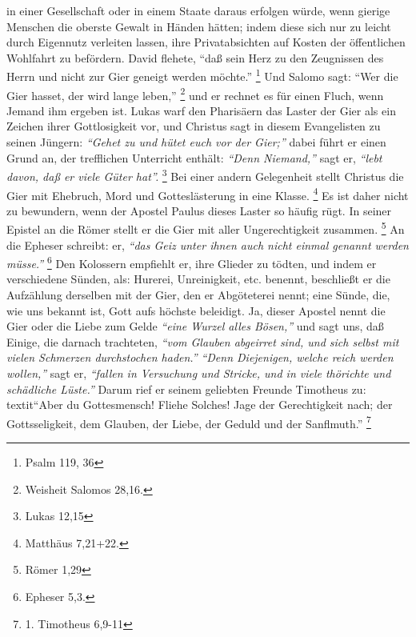 in einer
Gesellschaft oder in einem Staate daraus erfolgen würde, wenn
gierige Menschen
die oberste Gewalt in Händen hätten; indem diese sich nur zu leicht durch
Eigennutz verleiten lassen, ihre Privatabsichten auf Kosten der öffentlichen
Wohlfahrt zu befördern. David flehete,
"`daß sein Herz zu den Zeugnissen des
Herrn und nicht zur Gier geneigt werden möchte."'
\footnote{Psalm 119, 36}
Und
Salomo sagt:
"`Wer die Gier hasset, der wird lange leben,"'
\footnote{Weisheit Salomos 28,16.}
und er rechnet es für einen Fluch, wenn Jemand ihm ergeben ist. Lukas
warf den Pharisäern das Laster der Gier als ein
Zeichen ihrer Gottlosigkeit
vor, und Christus sagt in diesem Evangelisten zu seinen Jüngern:
\textit{"`Gehet zu und
hütet euch vor der Gier;"'} dabei führt er einen Grund an, der trefflichen
Unterricht enthält: \textit{"`Denn Niemand,"'} sagt er,
\textit{"`lebt davon, daß er viele Güter hat"'.}
\footnote{Lukas 12,15}
Bei einer andern Gelegenheit stellt Christus die Gier mit Ehebruch, Mord und
Gotteslästerung in eine Klasse.
\footnote{Matthäus 7,21+22.}
Es ist daher nicht zu bewundern, wenn der Apostel Paulus dieses
Laster so häufig rügt. In seiner Epistel an die Römer stellt er die Gier mit
aller Ungerechtigkeit zusammen.
\footnote{Römer 1,29}
An die Epheser schreibt: er,
\textit{"`das Geiz unter ihnen auch nicht einmal genannt werden müsse."'}
\footnote{Epheser 5,3.}
Den Kolossern empfiehlt er, ihre Glieder zu tödten, und indem er
verschiedene Sünden, als: Hurerei, Unreinigkeit, etc. benennt, beschließt er
die Aufzählung derselben mit der Gier, den er Abgöteterei
nennt; eine Sünde,
die, wie uns bekannt ist, Gott aufs höchste beleidigt. Ja, dieser Apostel nennt
die Gier oder die Liebe zum Gelde \textit{"`eine Wurzel alles Bösen,"'}
 und sagt uns, daß
Einige, die darnach trachteten, \textit{"`vom Glauben abgeirret sind, und sich
selbst
mit vielen Schmerzen durchstochen haden."'} \textit{"`Denn Diejenigen, welche
reich
werden wollen,"'} sagt er, \textit{"`fallen in Versuchung und Stricke, und in
viele
thörichte und schädliche Lüste."'} Darum rief er seinem geliebten Freunde
Timotheus zu:\\textit{"`Aber du Gottesmensch! Fliehe Solches! Jage der
Gerechtigkeit
nach; der Gottsseligkeit, dem Glauben, der Liebe, der Geduld und der
Sanflmuth."'}
\footnote{1. Timotheus 6,9-11}

